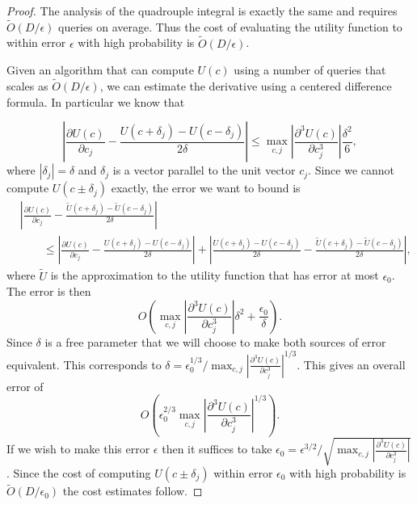 \documentclass[aps,amsmath,onecolumn,amssymb]{revtex4}
\begin{document}
\begin{proof}
The analysis of the quadrouple integral is exactly the same and requires $\tilde O(D/\epsilon)$ queries on average.  Thus the cost of evaluating the utility function to within error $\epsilon$ with high probability is $\tilde O(D/\epsilon)$.  

Given an algorithm that can compute $U(c)$ using a number of queries that scales as $\tilde{O}(D/\epsilon)$, we can estimate the derivative using a centered difference formula.  In particular we know that

\begin{equation}
\left|\frac{\partial U(c)}{\partial c_j}-\frac{U(c+\delta_j)-U(c-\delta_j)}{2\delta} \right|\le \max_{c,j} \left|\frac{\partial^3 U(c)}{\partial c_j^3} \right|\frac{\delta^2}{6},
\end{equation}
where $|\delta_j|=\delta$ and $\delta_j$ is a vector parallel to the unit vector $c_j$.
Since we cannot compute $U(c\pm\delta_j)$ exactly, the error we want to bound is
\begin{align}
&\left|\frac{\partial U(c)}{\partial c_j}-\frac{\tilde U(c+\delta_j)-\tilde U(c-\delta_j)}{2\delta} \right|\nonumber \\
&\qquad \le \left|\frac{\partial U(c)}{\partial c_j}-\frac{ U(c+\delta_j)- U(c-\delta_j)}{2\delta} \right|+\left|\frac{ U(c+\delta_j)- U(c-\delta_j)}{2\delta}-\frac{ \tilde U(c+\delta_j)- \tilde U(c-\delta_j)}{2\delta} \right|,
\end{align}
where $\tilde U$ is the approximation to the utility function that has error at most $\epsilon_0$.  The error is then
\begin{equation}
O\left(\max_{c,j} \left|\frac{\partial^3 U(c)}{\partial c_j^3} \right|{\delta^2}+\frac{\epsilon_0}{\delta}\right).
\end{equation}
Since $\delta$ is a free parameter that we will choose to make both sources of error equivalent.  This corresponds to $\delta= \epsilon_0^{1/3}/\max_{c,j} \left|\frac{\partial^3 U(c)}{\partial c_j^3} \right|^{1/3}$.  This gives an overall error of
\begin{equation}
O\left({\epsilon_0^{2/3}}{\max_{c,j}\left|\frac{\partial^3 U(c)}{\partial c_j^3} \right|^{1/3}} \right).
\end{equation}
If we wish to make this error $\epsilon$ then it suffices to take $\epsilon_0 = \epsilon^{3/2}/\sqrt{\max_{c,j}\left|\frac{\partial^3 U(c)}{\partial c_j^3} \right|}$.  Since the cost of computing $U(c\pm \delta_j)$ within error $\epsilon_0$ with high probability is $\tilde O(D/\epsilon_0)$ the cost estimates follow.
\end{proof}
\end{document}
